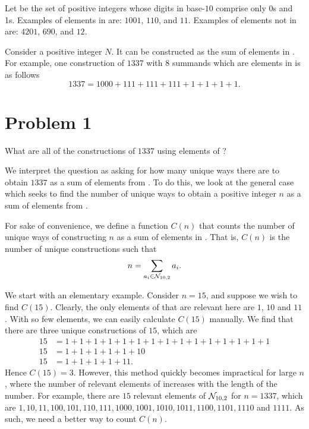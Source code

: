 
Let \NTen{} be the set of positive integers whose digits in base-$10$ comprise only 0s and 1s. Examples of elements in \NTen{} are: $1001$, $110$, and $11$. Examples of elements not in \NTen{} are: $4201$, $690$, and $12$.

Consider a positive integer $N$. It can be constructed as the sum of elements in \NTen{}. For example, one construction of $1337$ with $8$ summands which are elements in \NTen{} is as follows
\[
  1337 = 1000 + 111 + 111 + 111 + 1 + 1 + 1 + 1
.\] 

\section{Problem 1}
\begin{problem}\label{p1}
  What are all of the constructions of $1337$ using elements of \NTen{}?
\end{problem}
We interpret the question as asking for how many unique ways there are to obtain $1337$ as a sum of elements from \NTen{}. To do this, we look at the general case which seeks to find the number of unique ways to obtain a positive integer  $n$ as a sum of elements from \NTen{}.
\begin{definition}
  For sake of convenience, we define a function $C(n)$ that counts the number of unique ways of constructing $n$ as a sum of elements in \NTen{}. That is, $C(n)$ is the number of unique constructions such that \[
    n = \sum_{a_i \in \mathcal{N}_{10, 2}} a_i
  .\] 
\end{definition}
We start with an elementary example. Consider $n = 15$, and suppose we wish to find $C(15)$. Clearly, the only elements of \NTen{} that are relevant here are $1$, $10$ and $11$. With so few elements, we can easily calculate $C(15)$ manually. We find that there are three unique constructions of $15$, which are 
\begin{align*}
  15 &= 1 + 1 + 1 + 1 + 1 + 1 + 1 + 1 + 1 + 1 + 1 + 1 + 1 + 1 + 1 \\
  15 &= 1 + 1 + 1 + 1 + 1 + 10 \\
  15 &= 1 + 1 + 1 + 1 + 11.
\end{align*}
Hence $C(15) = 3$. However, this method quickly becomes impractical for large $n$, where the number of relevant elements of \NTen{} increases with the length of the number. For example, there are $15$ relevant elements of $\mathcal{N}_{10, 2}$ for $n = 1337$, which are $1, 10, 11, 100, 101, 110, 111, 1000, 1001, 1010, 1011, 1100, 1101, 1110$ and $1111$. As such, we need a better way to count $C(n)$.

